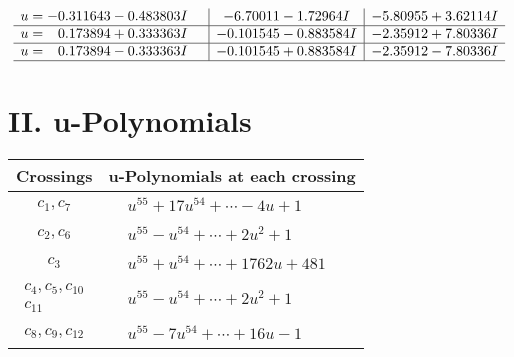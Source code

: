 \documentclass[1p]{elsarticle_modified}
\theoremstyle{definition}
\begin{document}
$$\begin{array}{c|c|c}
\begin{aligned}
u &= -0.311643 - 0.483803 I\end{aligned}
 & -6.70011 - 1.72964 I & -5.80955 + 3.62114 I \\ \hline\begin{aligned}
u &= \phantom{-}0.173894 + 0.333363 I\end{aligned}
 & -0.101545 - 0.883584 I & -2.35912 + 7.80336 I \\ \hline\begin{aligned}
u &= \phantom{-}0.173894 - 0.333363 I\end{aligned}
 & -0.101545 + 0.883584 I & -2.35912 - 7.80336 I\\
 \hline 
 \end{array}$$\newpage
\newpage\renewcommand{\arraystretch}{1}
\centering \section*{ II. u-Polynomials}
\begin{tabular}{m{50pt}|m{274pt}}
Crossings & \hspace{64pt}u-Polynomials at each crossing \\
\hline $$\begin{aligned}c_{1},c_{7}\end{aligned}$$&$\begin{aligned}
&u^{55}+17 u^{54}+\cdots-4 u+1
\end{aligned}$\\
\hline $$\begin{aligned}c_{2},c_{6}\end{aligned}$$&$\begin{aligned}
&u^{55}- u^{54}+\cdots+2 u^2+1
\end{aligned}$\\
\hline $$\begin{aligned}c_{3}\end{aligned}$$&$\begin{aligned}
&u^{55}+u^{54}+\cdots+1762 u+481
\end{aligned}$\\
\hline $$\begin{aligned}c_{4},c_{5},c_{10}\\c_{11}\end{aligned}$$&$\begin{aligned}
&u^{55}- u^{54}+\cdots+2 u^2+1
\end{aligned}$\\
\hline $$\begin{aligned}c_{8},c_{9},c_{12}\end{aligned}$$&$\begin{aligned}
&u^{55}-7 u^{54}+\cdots+16 u-1
\end{aligned}$\\
\hline
\end{tabular}\newpage\renewcommand{\arraystretch}{1}
\end{document}
